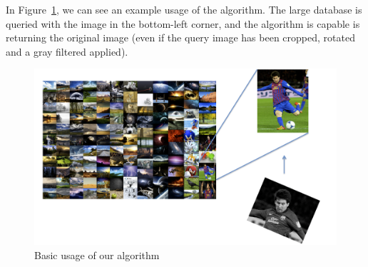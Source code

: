 In Figure~\ref{fig:basicUsage}, we can see an example usage of the algorithm. The large database is queried with the image in the bottom-left corner, and the algorithm is capable is returning the original image (even if the query image has been cropped, rotated and a gray filtered applied).

\begin{figure}[ht!]
\centering
\includegraphics[width=.8\linewidth]{images/basicUsage.png}
\caption{Basic usage of our algorithm}
\label{fig:basicUsage}
\end{figure}